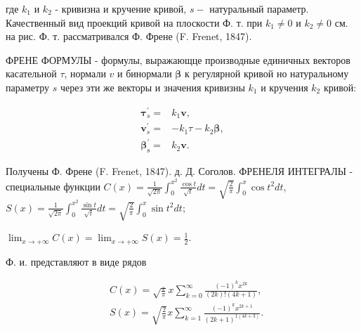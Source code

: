 \documentclass[10pt]{article}
\begin{document}
где $k_{1}$ и $k_{2}$ - кривизна и кручение кривой, $s-$ натуральный параметр. Качественный вид проекций кривой на плоскости Ф. т. при $k_{1} \neq 0$ и $k_{2} \neq 0$ см. на рис. Ф. т. рассматривался Ф. Френе (F. Frenet, 1847).



ФРЕНЕ ФОРМУЛЫ - формулы, выражающце производные единичных векторов касательной $\tau$, нормали $v$ и бинормали $\boldsymbol{\beta}$ к регулярной кривой но натуральному параметру $s$ через эти же векторы и значения кривизны $k_{1}$ и кручения $k_{2}$ кривой:



\[

\begin{array}{ll}

\boldsymbol{\tau}_{s}^{\prime}= & k_{1} \boldsymbol{v}, \\

\boldsymbol{v}_{s}^{\prime}= & -k_{1} \tau-k_{2} \boldsymbol{\beta}, \\

\boldsymbol{\beta}_{\mathrm{s}}^{\prime}= & k_{2} \boldsymbol{v} .

\end{array}

\]



Получены Ф. Френе (F. Frenet, 1847). д. Д. Соголов. ФРЕНЕЛЯ ИНТЕГРАЛЫ - специальные функции $C(x)=\frac{1}{\sqrt{2 \pi}} \int_{0}^{x^{2}} \frac{\cos t}{\sqrt{t}} d t=\sqrt{\frac{2}{\pi}} \int_{0}^{x} \cos t^{2} d t$, $S(x)=\frac{1}{\sqrt{2 \pi}} \int_{0}^{x^{2}} \frac{\sin t}{\sqrt{t}} d t=\sqrt{\frac{2}{\pi}} \int_{0}^{x} \sin t^{2} d t ;$



$\lim _{x \rightarrow+\infty} C(x)=\lim _{x \rightarrow+\infty} S(x)=\frac{1}{2}$.



Ф. и. представляют в виде рядов



\[

\begin{aligned}

& C(x)=\sqrt{\frac{{ }_{2}}{\pi}} x \sum_{k=0}^{\infty} \frac{(-1)^{k} x^{2 k}}{(2 k) !(4 k+1)}, \\

& S(x)=\sqrt{\frac{2}{\pi}} x \sum_{k=1}^{\infty} \frac{(-1)^{k} x^{2 k+1}}{(2 k+1)^{1(4 k+3)}} .

\end{aligned}

\]
\end{document}
